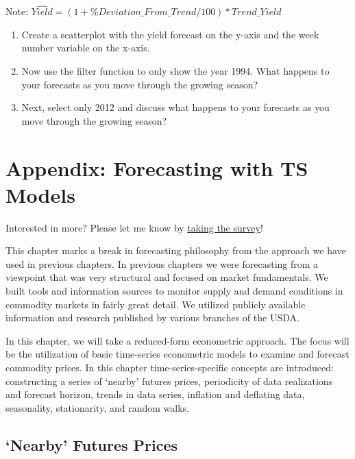 \documentclass[
  letterpaper,
  DIV=11,
  numbers=noendperiod]{scrreprt}
\begin{document}
Note: \(\hat{Yield}=(1+\%Deviation\_From\_Trend/100)*Trend\_Yield\)

\begin{enumerate}
\def\labelenumi{\arabic{enumi}.}
\setcounter{enumi}{8}
\item
  Create a scatterplot with the yield forecast on the y-axis and the
  week number variable on the x-axis.
\item
  Now use the filter function to only show the year 1994. What happens
  to your forecasts as you move through the growing season?
\item
  Next, select only 2012 and discuss what happens to your forecasts as
  you move through the growing season?
\end{enumerate}


\chapter{Appendix: Forecasting with TS
Models}\label{appendix-forecasting-with-ts-models}

{Interested in more? Please let me know by}
\href{https://forms.gle/Q3VByCQZHjfQSy9D7}{taking the survey}!

This chapter marks a break in forecasting philosophy from the approach
we have used in previous chapters. In previous chapters we were
forecasting from a viewpoint that was very structural and focused on
market fundamentals. We built tools and information sources to monitor
supply and demand conditions in commodity markets in fairly great
detail. We utilized publicly available information and research
published by various branches of the USDA.

In this chapter, we will take a reduced-form econometric approach. The
focus will be the utilization of basic time-series econometric models to
examine and forecast commodity prices. In this chapter
time-series-specific concepts are introduced: constructing a series of
`nearby' futures prices, periodicity of data realizations and forecast
horizon, trends in data series, inflation and deflating data,
seasonality, stationarity, and random walks.

\section{`Nearby' Futures Prices}\label{nearby-futures-prices}
\end{document}
